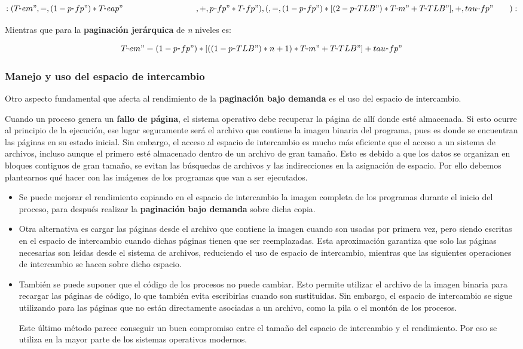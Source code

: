 \[{:(T_"em", =, (1-p_"fp")*T_"eap" \qquad\qquad\qquad\qquad\ \ \ , +, p_"fp"*T_"fp"),
    (    , =, (1-p_"fp")*[(2-p_"TLB")*T_"m" + T_"TLB"], +, tau_"fp"\qquad):}\]

Mientras que para la \textbf{paginación jerárquica} de \emph{n} niveles
es:

\[T_"em" = (1-p_"fp")*[((1-p_"TLB")*n+1)*T_"m" + T_"TLB"] + tau_"fp"\]

\subsubsection{Manejo y uso del espacio de
intercambio}\label{_manejo_y_uso_del_espacio_de_intercambio}

Otro aspecto fundamental que afecta al rendimiento de la
\textbf{paginación bajo demanda} es el uso del espacio de intercambio.

Cuando un proceso genera un \textbf{fallo de página}, el sistema
operativo debe recuperar la página de allí donde esté almacenada. Si
esto ocurre al principio de la ejecución, ese lugar seguramente será el
archivo que contiene la imagen binaria del programa, pues es donde se
encuentran las páginas en su estado inicial. Sin embargo, el acceso al
espacio de intercambio es mucho más eficiente que el acceso a un sistema
de archivos, incluso aunque el primero esté almacenado dentro de un
archivo de gran tamaño. Esto es debido a que los datos se organizan en
bloques contiguos de gran tamaño, se evitan las búsquedas de archivos y
las indirecciones en la asignación de espacio. Por ello debemos
plantearnos qué hacer con las imágenes de los programas que van a ser
ejecutados.

\begin{itemize}
\item
  Se puede mejorar el rendimiento copiando en el espacio de intercambio
  la imagen completa de los programas durante el inicio del proceso,
  para después realizar la \textbf{paginación bajo demanda} sobre dicha
  copia.
\item
  Otra alternativa es cargar las páginas desde el archivo que contiene
  la imagen cuando son usadas por primera vez, pero siendo escritas en
  el espacio de intercambio cuando dichas páginas tienen que ser
  reemplazadas. Esta aproximación garantiza que solo las páginas
  necesarias son leídas desde el sistema de archivos, reduciendo el uso
  de espacio de intercambio, mientras que las siguientes operaciones de
  intercambio se hacen sobre dicho espacio.
\item
  También se puede suponer que el código de los procesos no puede
  cambiar. Esto permite utilizar el archivo de la imagen binaria para
  recargar las páginas de código, lo que también evita escribirlas
  cuando son sustituidas. Sin embargo, el espacio de intercambio se
  sigue utilizando para las páginas que no están directamente asociadas
  a un archivo, como la pila o el montón de los procesos.

  Este último método parece conseguir un buen compromiso entre el tamaño
  del espacio de intercambio y el rendimiento. Por eso se utiliza en la
  mayor parte de los sistemas operativos modernos.
\end{itemize}

